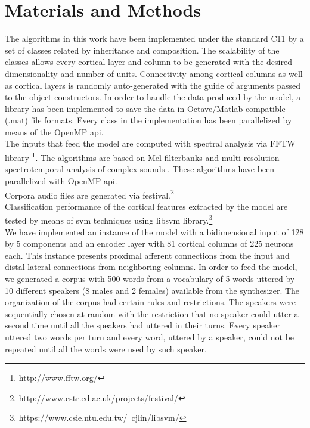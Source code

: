 \documentclass[11pt,a4paper]{article}
\newcommand{\CC}{C\nolinebreak\hspace{-.05em}\raisebox{.4ex}{\tiny\bf +}\nolinebreak\hspace{-.10em}\raisebox{.4ex}{\tiny\bf +}}
\begin{document}
\section{Materials and Methods}

The algorithms in this work have been implemented under the standard \CC11 by a set of
classes related by inheritance and composition.
The scalability of the classes allows every cortical layer and column to be generated
with the desired dimensionality and number of units. Connectivity among cortical columns as well as
cortical layers is randomly auto-generated with the guide of arguments passed to the
object constructors. In order to handle the data produced by the model,
a library has been implemented to save the data in Octave/Matlab compatible (.mat) file formats.
Every class in the implementation has been parallelized by means of the OpenMP \gls{api}. \\

The inputs that feed the model are computed
with spectral analysis via FFTW library \footnote{http://www.fftw.org/}.
The algorithms are based on 
Mel filterbanks and multi-resolution
spectrotemporal analysis of complex sounds \cite{taishih_2005}.
These algorithms have been parallelized with OpenMP \gls{api}. \\

Corpora audio files are generated via \gls{festival}.\footnote{http://www.cstr.ed.ac.uk/projects/festival/} \\

Classification performance of the cortical features extracted by the model are tested by means of
\gls{svm} techniques using \gls{libsvm} library.\footnote{https://www.csie.ntu.edu.tw/~cjlin/libsvm/} \\

We have implemented an instance of the model with a bidimensional input
of 128 by 5 components and an encoder layer
with 81 cortical columns of 225 neurons each.
This instance presents proximal afferent connections
from the input and distal lateral connections from
neighboring columns.
In order to feed the model, we generated a corpus with 500 words from a vocabulary of
5 words uttered by 10 different speakers (8 males and 2 females) available from the synthesizer.
The organization of the corpus had certain rules and restrictions.
The speakers were sequentially chosen at random with the restriction that no speaker could
utter a second time until all the speakers had uttered in their turns.
Every speaker uttered two words per turn and every word, uttered by a speaker,
could not be repeated until all the words were used by such speaker. \\
\end{document}
